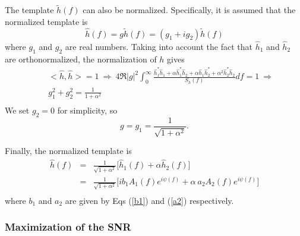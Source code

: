 The template $\tilde{h}(f)$ can also be normalized.
Specifically, it is assumed that the normalized template is
\begin{equation}
\hat{h}(f) = g \tilde{h}(f) = (g_1 + i g_2) \tilde{h}(f)
\end{equation}
where $g_1$ and $g_2$ are real numbers.
Taking into account the fact that $\hat{h}_1$ and $\hat{h}_2$ are
orthonormalized,
the normalization of $h$ gives
\begin{eqnarray}
&& <\hat{h}, \hat{h}> = 1 \: \Rightarrow \:
4 \Re |g|^2 \int_0^{\infty} \frac{\hat{h}_1^{\ast} \hat{h}_1 +
\alpha \hat{h}_1^{\ast} \hat{h}_2 + \alpha \hat{h}_1 \hat{h}_2^{\ast} +
\alpha^2 \hat{h}_2^{\ast} \hat{h}_2 }{S_h(f)} df = 1 \: \Rightarrow \\
&& g_1^2 + g_2^2 = \frac{1}{1+\alpha^2} \\
\label{Normalize}
\end{eqnarray}
We set $g_2 = 0$ for simplicity, so
\begin{equation}
g = g_1 = \frac{1}{\sqrt{1 + \alpha^2}}.
\end{equation}

Finally, the normalized template is
\begin{eqnarray}
\hat{h}(f) &=& \frac{1}{\sqrt{1+\alpha^2}} \Big [ \hat{h}_1(f) +
\alpha \hat{h}_2(f) \Big ] \\
    &=& \frac{1}{\sqrt{1+\alpha^2}} \Big [ i b_1 A_1(f) e^{i \psi(f)} +
\alpha \: a_2 A_2(f) e^{i \psi(f)} \Big ] \\
\label{NormalizedTmplt}
\end{eqnarray}
where $b_1$ and $a_2$ are given by Eqs (\ref{b1}) and (\ref{a2}) respectively.


\subsubsection*{Maximization of the SNR}
\label{SNRMaximization}

